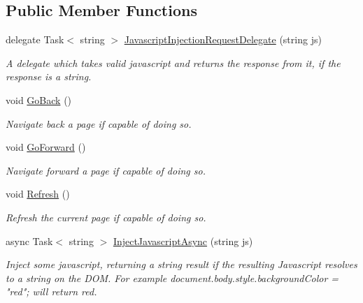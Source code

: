 \subsection*{Public Member Functions}
\begin{DoxyCompactItemize}
\item 
delegate Task$<$ string $>$ \hyperlink{class_xam_1_1_plugin_1_1_web_view_1_1_abstractions_1_1_forms_web_view_ab996fc2e09bce6f42e697e8faccea20c}{Javascript\+Injection\+Request\+Delegate} (string js)
\begin{DoxyCompactList}\small\item\em A delegate which takes valid javascript and returns the response from it, if the response is a string. \end{DoxyCompactList}\item 
void \hyperlink{class_xam_1_1_plugin_1_1_web_view_1_1_abstractions_1_1_forms_web_view_a20b5e4e87cd76967d336cc7d174e156b}{Go\+Back} ()
\begin{DoxyCompactList}\small\item\em Navigate back a page if capable of doing so. \end{DoxyCompactList}\item 
void \hyperlink{class_xam_1_1_plugin_1_1_web_view_1_1_abstractions_1_1_forms_web_view_a136009d93e59263b9468d91bc8d9cfca}{Go\+Forward} ()
\begin{DoxyCompactList}\small\item\em Navigate forward a page if capable of doing so. \end{DoxyCompactList}\item 
void \hyperlink{class_xam_1_1_plugin_1_1_web_view_1_1_abstractions_1_1_forms_web_view_a248d560c049ea9a568d6daef207d33b2}{Refresh} ()
\begin{DoxyCompactList}\small\item\em Refresh the current page if capable of doing so. \end{DoxyCompactList}\item 
async Task$<$ string $>$ \hyperlink{class_xam_1_1_plugin_1_1_web_view_1_1_abstractions_1_1_forms_web_view_aa5008d9dfe18f595a9dc7d9cb960b39b}{Inject\+Javascript\+Async} (string js)
\begin{DoxyCompactList}\small\item\em Inject some javascript, returning a string result if the resulting Javascript resolves to a string on the D\+OM. For example \textquotesingle{}document.\+body.\+style.\+background\+Color = "red";\textquotesingle{} will return \textquotesingle{}red\textquotesingle{}. \end{DoxyCompactList}\item 

\end{DoxyCompactItemize}
